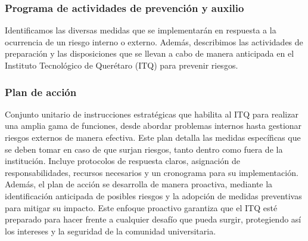 % 
\subsubsection{Programa de actividades de prevención y auxilio}
% 
Identificamos las diversas medidas que se implementarán en respuesta a la ocurrencia de un riesgo interno o externo. Además, describimos las actividades de preparación y las disposiciones que se llevan a cabo de manera anticipada en el Instituto Tecnológico de Querétaro (ITQ) para prevenir riesgos.
% 
\subsubsection{Plan de acción}
%
Conjunto unitario de instrucciones estratégicas que habilita al ITQ para realizar una amplia gama de funciones, desde abordar problemas internos hasta gestionar riesgos externos de manera efectiva. Este plan detalla las medidas específicas que se deben tomar en caso de que surjan riesgos, tanto dentro como fuera de la institución. Incluye protocolos de respuesta claros, asignación de responsabilidades, recursos necesarios y un cronograma para su implementación. Además, el plan de acción se desarrolla de manera proactiva, mediante la identificación anticipada de posibles riesgos y la adopción de medidas preventivas para mitigar su impacto. Este enfoque proactivo garantiza que el ITQ esté preparado para hacer frente a cualquier desafío que pueda surgir, protegiendo así los intereses y la seguridad de la comunidad universitaria.

